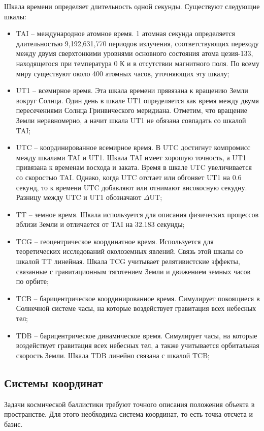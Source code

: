 Шкала времени определяет длительность одной секунды. Существуют следующие шкалы:
\begin{itemize}
    \item TAI -- международное атомное время.
    1 атомная секунда определяется длительностью 9,192,631,770 периодов излучения, 
    соответствующих переходу между двумя сверхтонкими уровнями основного состояния
    атома цезия-133, находящегося при температура 0 К и в отсутствии магнитного поля.
    По всему миру существуют около 400 атомных часов, уточняющих эту шкалу;
    \item UT1 -- всемирное время.  Эта шкала времени прявязана к вращению Земли вокруг Солнца.
    Один день в шкале UT1 определяется как время между двумя пересечениями
    Солнца Гринвического меридиана.
    Отметим, что вращение Земли неравномерно, а начит шкала UT1 не обязана
    совпадать со шкалой TAI;
    \item UTC -- координированное всемирное время. 
    В UTC достигнут компромисс между шкалами TAI и UT1. Шкала TAI имеет
    хорошую точность, а UT1 привязана к временам восхода и заката. 
    Время в шкале UTC увеличивается со скоростью TAI. Однако, когда UTC отстает
    или обгоняет UT1 на 0.6 секунд, то к времени UTC добавляют или отнимают
    високосную секудну. Разницу между UTC и UT1 обозначают $\Delta$UT;
    \item TT -- земное время. Шкала используется для описания
    физических процессов вблизи Земли и отличается от TAI на 32.183 секунды;
    \item TCG -- геоцентрическое координатное время. Используется для теоретических
    исследований околоземных явлений. Связь этой шкалы со шкалой TT линейная.
    Шкала TCG учитывает релятивистские эффекты, связанные с гравитационным
    тяготением Земли и движением земных часов по орбите;
    \item TCB -- барицентрическое координированное время. Симулирует покоящиеся в Солнечной
    системе часы, на которые воздействует гравитация всех небесных тел;
    \item TDB -- барицентрическое динамическое время. Симулирует часы, на которые
    воздействует гравитация всех небесных тел, а также учитывается орбитальная
    скорость Земли. Шкала TDB линейно связана с шкалой TCB;
\end{itemize}

\subsection{Системы координат}
Задачи космической баллистики требуют точного описания положения объекта в пространстве.
Для этого необходима система координат, то есть точка отсчета и базис.

